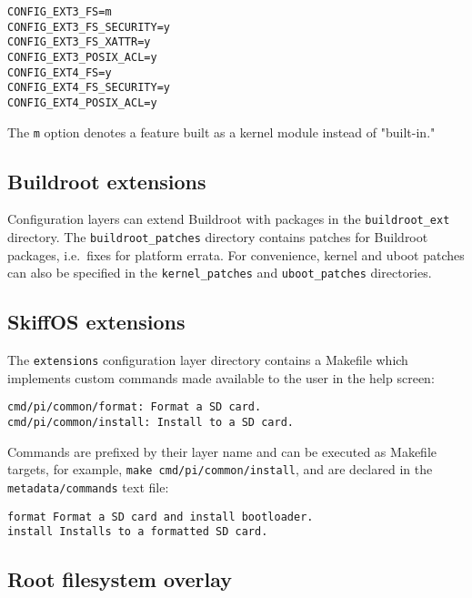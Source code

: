 \documentclass[english,]{IEEEtran}
\begin{document}
\begin{verbatim}
CONFIG_EXT3_FS=m
CONFIG_EXT3_FS_SECURITY=y
CONFIG_EXT3_FS_XATTR=y
CONFIG_EXT3_POSIX_ACL=y
CONFIG_EXT4_FS=y
CONFIG_EXT4_FS_SECURITY=y
CONFIG_EXT4_POSIX_ACL=y
\end{verbatim}

The \texttt{m} option denotes a feature built as a kernel module instead
of "built-in."

\hypertarget{buildroot-extensions}{%
\subsection{Buildroot extensions}\label{buildroot-extensions}}

Configuration layers can extend Buildroot with packages in the
\texttt{buildroot\_ext} directory. The \texttt{buildroot\_patches}
directory contains patches for Buildroot packages, i.e.~fixes for
platform errata. For convenience, kernel and uboot patches can also be
specified in the \texttt{kernel\_patches} and \texttt{uboot\_patches}
directories.

\hypertarget{skiffos-extensions}{%
\subsection{SkiffOS extensions}\label{skiffos-extensions}}

The \texttt{extensions} configuration layer directory contains a
Makefile which implements custom commands made available to the user in
the help screen:

\begin{verbatim}
cmd/pi/common/format: Format a SD card.
cmd/pi/common/install: Install to a SD card.
\end{verbatim}

Commands are prefixed by their layer name and can be executed as
Makefile targets, for example, \texttt{make\ cmd/pi/common/install}, and
are declared in the \texttt{metadata/commands} text file:

\begin{verbatim}
format Format a SD card and install bootloader.
install Installs to a formatted SD card.
\end{verbatim}

\hypertarget{root-filesystem-overlay}{%
\subsection{Root filesystem overlay}\label{root-filesystem-overlay}}
\end{document}
